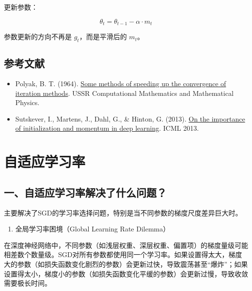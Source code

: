 更新参数：

\[
\theta_t = \theta_{t-1} - \alpha \cdot m_t
\]

参数更新的方向不再是 \(g_t\)，而是平滑后的 \(m_t\)。

\hypertarget{ux53c2ux8003ux6587ux732e-24}{%
\subsection{参考文献}\label{ux53c2ux8003ux6587ux732e-24}}

\begin{itemize}
\tightlist
\item
  Polyak, B. T. (1964). \href{https://doi.org/10.1016/0041-5553(64)90137-5}{Some methods of speeding up the convergence of iteration methods}. USSR Computational Mathematics and Mathematical Physics.
\item
  Sutskever, I., Martens, J., Dahl, G., \& Hinton, G. (2013). \href{https://proceedings.mlr.press/v28/sutskever13.html}{On the importance of initialization and momentum in deep learning}. ICML 2013.
\end{itemize}

\clearpage

\hypertarget{ux81eaux9002ux5e94ux5b66ux4e60ux7387}{%
\section{自适应学习率}\label{ux81eaux9002ux5e94ux5b66ux4e60ux7387}}

\hypertarget{ux4e00ux81eaux9002ux5e94ux5b66ux4e60ux7387ux89e3ux51b3ux4e86ux4ec0ux4e48ux95eeux9898}{%
\subsection{一、自适应学习率解决了什么问题？}\label{ux4e00ux81eaux9002ux5e94ux5b66ux4e60ux7387ux89e3ux51b3ux4e86ux4ec0ux4e48ux95eeux9898}}

主要解决了SGD的学习率选择问题，特别是当不同参数的梯度尺度差异巨大时。

\begin{enumerate}
\def\labelenumi{\arabic{enumi}.}
\tightlist
\item
  全局学习率困境（Global Learning Rate Dilemma）
\end{enumerate}

在深度神经网络中，不同参数（如浅层权重、深层权重、偏置项）的梯度量级可能相差数个数量级。SGD对所有参数都使用同一个学习率。如果设置得太大，梯度大的参数（如损失函数变化剧烈的参数）会更新过快，导致震荡甚至``爆炸''；如果设置得太小，梯度小的参数（如损失函数变化平缓的参数）会更新过慢，导致收敛需要极长时间。


